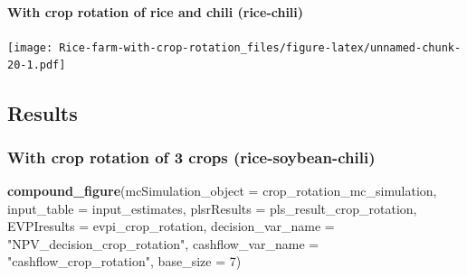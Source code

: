 \documentclass[
]{article}
\newenvironment{Shaded}{\begin{snugshade}}{\end{snugshade}}
\newcommand{\AttributeTok}[1]{\textcolor[rgb]{0.13,0.29,0.53}{#1}}
\newcommand{\DecValTok}[1]{\textcolor[rgb]{0.00,0.00,0.81}{#1}}
\newcommand{\FunctionTok}[1]{\textcolor[rgb]{0.13,0.29,0.53}{\textbf{#1}}}
\newcommand{\NormalTok}[1]{#1}
\newcommand{\OtherTok}[1]{\textcolor[rgb]{0.56,0.35,0.01}{#1}}
\newcommand{\SpecialCharTok}[1]{\textcolor[rgb]{0.81,0.36,0.00}{\textbf{#1}}}
\newcommand{\StringTok}[1]{\textcolor[rgb]{0.31,0.60,0.02}{#1}}
\begin{document}
\hypertarget{with-crop-rotation-of-rice-and-chili-rice-chili-1}{%
\paragraph{With crop rotation of rice and chili
(rice-chili)}\label{with-crop-rotation-of-rice-and-chili-rice-chili-1}}

\begin{Shaded}
\end{Shaded}

\texttt{[image: Rice-farm-with-crop-rotation\_files/figure-latex/unnamed-chunk-20-1.pdf]}

\hypertarget{results}{%
\subsection{Results}\label{results}}

\hypertarget{with-crop-rotation-of-3-crops-rice-soybean-chili-2}{%
\subsubsection{With crop rotation of 3 crops
(rice-soybean-chili)}\label{with-crop-rotation-of-3-crops-rice-soybean-chili-2}}

\begin{Shaded}
\begin{Highlighting}[]
\FunctionTok{compound\_figure}\NormalTok{(}\AttributeTok{mcSimulation\_object =}\NormalTok{ crop\_rotation\_mc\_simulation, }
                \AttributeTok{input\_table =}\NormalTok{ input\_estimates, }\AttributeTok{plsrResults =}\NormalTok{ pls\_result\_crop\_rotation, }
                \AttributeTok{EVPIresults =}\NormalTok{ evpi\_crop\_rotation, }\AttributeTok{decision\_var\_name =} \StringTok{"NPV\_decision\_crop\_rotation"}\NormalTok{, }
                \AttributeTok{cashflow\_var\_name =} \StringTok{"cashflow\_crop\_rotation"}\NormalTok{, }
                \AttributeTok{base\_size =} \DecValTok{7}\NormalTok{)}
\end{Highlighting}
\end{Shaded}
\end{document}
